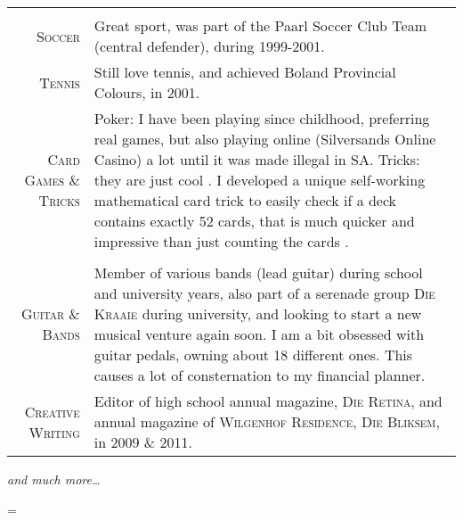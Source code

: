 \documentclass[a4paper,10pt,notitlepage]{article}
\newenvironment{absolutelynopagebreak}
  {\par\nobreak\vfil\penalty0\vfilneg
   \vtop\bgroup}
  {\par\xdef\tpd{\the\prevdepth}\egroup
   \prevdepth=\tpd}
\begin{document}
\begin{absolutelynopagebreak}
\begin{tabular}{r|p{11cm}}
		\multicolumn{2}{c}{} \\
		  
		\textsc{Soccer}               & Great sport, was part of the Paarl Soccer Club Team (central defender), during 1999-2001. \\
		\textsc{Tennis}               & Still love tennis, and achieved Boland Provincial Colours, in 2001. \\
		
		\textsc{Card Games \& Tricks} & Poker: I have been playing since childhood, preferring real games, but also playing online (Silversands Online                                      Casino) a lot until it was made illegal in SA. Tricks: they are just cool \smiley{}. I developed a unique                                           self-working mathematical card trick to easily check if a deck contains exactly 52 cards, that is much quicker and                                  impressive than just counting the cards \smiley{}. \\
		 
		\multicolumn{2}{c}{} \\
		 
		\textsc{Guitar \& Bands}      & Member of various bands (lead guitar) during school and university years, also part of a serenade group \textsc{Die Kraaie} during university, and looking to start a new musical venture again soon. I am a bit obsessed with guitar pedals, owning about 18 different ones. This causes a lot of consternation to my financial planner. \\
		\textsc{Creative Writing}     & Editor of high school annual magazine, \textsc{Die Retina}, and annual magazine of \textsc{Wilgenhof Residence}, \textsc{Die Bliksem}, in 2009 \& 2011. \\
		 
	\end{tabular}
	
	\textit{and much more\ldots}
	
\end{absolutelynopagebreak}
	
	
\end{document}
